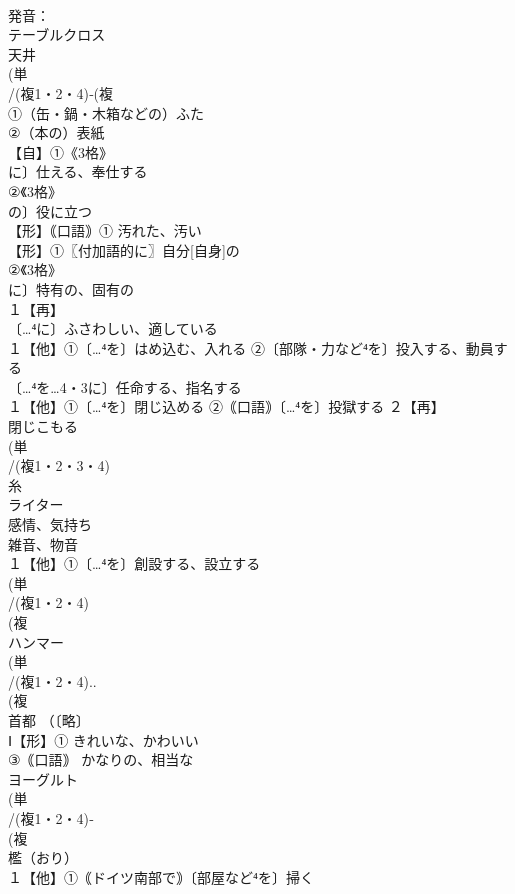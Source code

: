 \documentclass[8pt]{extreport}
\begin{document}
\begin{CJK}{UTF8}{min}
\\	発音：
\\	テーブルクロス　　
\\	天井
\\	(単
\\	/(複1・2・4)‐(複
\\	①（缶・鍋・木箱などの）ふた 
\\	②（本の）表紙
\\	【自】①《3格》
\\	に〕仕える、奉仕する 
\\	②《3格》
\\	の〕役に立つ 
\\	【形】｟口語｠① 汚れた、汚い 
\\	【形】①〖付加語的に〗自分[自身]の 
\\	②《3格》
\\	に〕特有の、固有の
\\	１【再】
\\	〔…⁴に〕ふさわしい、適している
\\	１【他】①〔…⁴を〕はめ込む、入れる ②〔部隊・力など⁴を〕投入する、動員する 
\\	〔…⁴を…4・3に〕任命する、指名する
\\	１【他】①〔…⁴を〕閉じ込める ②｟口語｠〔…⁴を〕投獄する ２【再】
\\	閉じこもる
\\	(単
\\	/(複1・2・3・4)
\\	糸 
\\	ライター 
\\	感情、気持ち 
\\	雑音、物音 
\\	１【他】①〔…⁴を〕創設する、設立する 
\\	(単
\\	/(複1・2・4)
\\	(複
\\	ハンマー 
\\	(単
\\	/(複1・2・4)..
\\	(複
\\	首都 （〔略〕
\\	Ⅰ【形】① きれいな、かわいい 
\\	③｟口語｠ かなりの、相当な
\\	ヨーグルト 
\\	(単
\\	/(複1・2・4)‐
\\	(複
\\	檻（おり） 
\\	１【他】①｟ドイツ南部で｠〔部屋など⁴を〕掃く 

\end{CJK}
\end{document}
